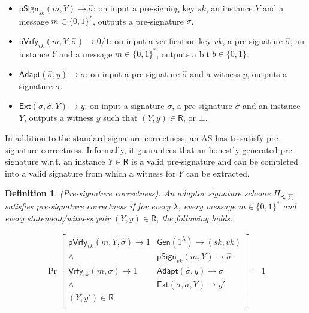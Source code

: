 \documentclass{llncs}
\newtheorem{Definition}{Definition}
\begin{document}
\begin{itemize}
\item $\mathsf{pSign}_{sk}(m,Y)\rightarrow \hat{\sigma}$: on input a pre-signing key $sk$, an instance $Y$ and a message $m \in \{0, 1\}^*$, outputs a pre-signature $\hat{\sigma}$.

\item $\mathsf{pVrfy}_{vk}(m,Y,\hat{\sigma})\rightarrow 0/1$: on input a verification key $vk$, a pre-signature $\hat{\sigma}$, an instance $Y$ and a message $m \in \{0, 1\}^*$, outputs a bit $b\in \{0, 1\}$.

\item $\mathsf{Adapt}(\hat{\sigma},y)\rightarrow \sigma$: on input a pre-signature $\hat{\sigma}$ and a witness $y$, outputs a signature $\sigma$.

\item $\mathsf{Ext}(\sigma,\hat{\sigma},Y)\rightarrow y$: on input a signature $\sigma$, a pre-signature $\hat{\sigma}$ and an instance $Y$, outputs a witness $y$ such that $(Y,y)\in \mathsf{R}$, or $\bot$.
\end{itemize}

In addition to the standard signature correctness, an AS has to satisfy pre-signature correctness. Informally, it guarantees that an honestly generated pre-signature w.r.t. an instance $Y \in \mathsf{R}$ is a valid pre-signature and can be completed into a valid signature from which a witness for $Y$ can be extracted.

\begin{Definition}\emph{(Pre-signature correctness)}. An adaptor signature scheme $\Pi_{\mathsf{R},\sum}$ satisfies pre-signature correctness if for every $\lambda$, every message $m \in \{0,1\}^*$ and every statement/witness pair $(Y, y) \in \mathsf{R}$, the following holds:
\end{Definition}

\begin{equation*}
\begin{aligned}
\Pr\left[
\begin{array}{c|c}
\mathsf{pVrfy}_{vk}(m,Y,\hat{\sigma})\rightarrow 1 & \mathsf{Gen}(1^\lambda)\rightarrow (sk,vk) \\
\wedge & \mathsf{pSign}_{vk}(m,Y)\rightarrow \hat{\sigma}\\               
\mathsf{Vrfy}_{vk}(m,\sigma)\rightarrow 1  & \mathsf{Adapt}(\hat{\sigma},y)\rightarrow \sigma\\
\wedge  & \mathsf{Ext}(\sigma,\hat{\sigma},Y)\rightarrow y'\\
(Y,y')\in \mathsf{R} & \\
\end{array}
\right]=1
\end{aligned}
\end{equation*}
\end{document}
